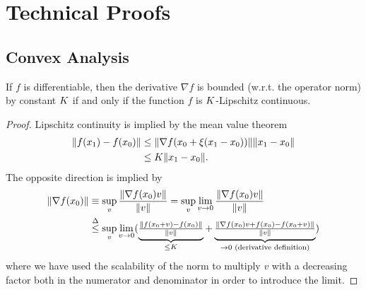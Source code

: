 

\chapter{Technical Proofs}

\section{Convex Analysis}

\begin{lemma}\label{Appdx-lem: lipschitz and bounded derivative}
	If \(f\) is differentiable, then the derivative \(\nabla f\) is
	bounded (w.r.t. the operator norm) by constant \(K\) if and only if the function
	\(f\) is \(K\)-Lipschitz continuous.
\end{lemma}
\begin{proof}
	Lipschitz continuity is implied by the mean value theorem
	\begin{align*}
		\|f(x_1) - f(x_0)\|
		&\le \|\nabla f(x_0 + \xi(x_1-x_0))\| \|x_1- x_0\|\\
		&\le K \|x_1-x_0\|.
	\end{align*}
	The opposite direction is implied by
	\begin{align*}
		\|\nabla f(x_0)\|
		&\equiv \sup_{v} \frac{\|\nabla f(x_0)v\|}{\|v\|}
		= \sup_{v} \lim_{v\to 0}\frac{\|\nabla f(x_0)v\|}{\|v\|}\\
		&\lxle{\Delta}\sup_{v} \lim_{v\to 0}
		(
			\underbrace{
				\tfrac{\|f(x_0 + v) - f(x_0) \|}{\|v\|}
			}_{
				\le \lipConst 
			}
			+ \underbrace{
				\tfrac{\|\nabla f(x_0)v + f(x_0) - f(x_0 +v)\|}{\|v\|}
			}_{
				\to 0 \text{ (derivative definition)}
			}
		)
	\end{align*}
	where we have used the scalability of the norm to multiply \(v\) with a
	decreasing factor both in the numerator and denominator in order to introduce
	the limit.
\end{proof}

